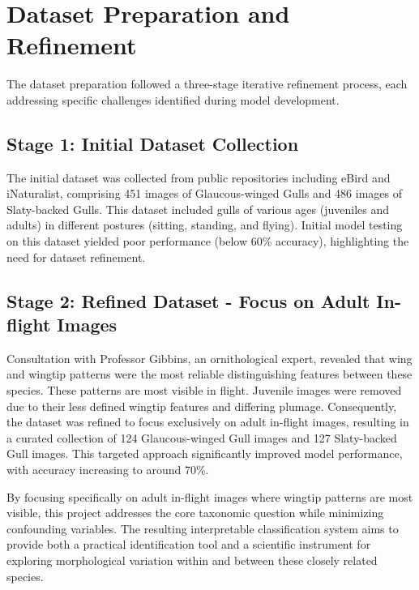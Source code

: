 \documentclass[a4paper,12pt]{report}
\begin{document}
\section{Dataset Preparation and Refinement}

The dataset preparation followed a three-stage iterative refinement process, each addressing specific challenges identified during model development.

\subsection{Stage 1: Initial Dataset Collection}

The initial dataset was collected from public repositories including eBird and iNaturalist, comprising 451 images of Glaucous-winged Gulls and 486 images of Slaty-backed Gulls. This dataset included gulls of various ages (juveniles and adults) in different postures (sitting, standing, and flying). Initial model testing on this dataset yielded poor performance (below 60\% accuracy), highlighting the need for dataset refinement. 


\subsection{Stage 2: Refined Dataset - Focus on Adult In-flight Images}

Consultation with Professor Gibbins, an ornithological expert, revealed that wing and wingtip patterns were the most reliable distinguishing features between these species. These patterns are most visible in flight. Juvenile images were removed due to their less defined wingtip features and differing plumage. Consequently, the dataset was refined to focus exclusively on adult in-flight images, resulting in a curated collection of 124 Glaucous-winged Gull images and 127 Slaty-backed Gull images. This targeted approach significantly improved model performance, with accuracy increasing to around 70\%.

By focusing specifically on adult in-flight images where wingtip patterns are most visible, this project addresses the core taxonomic question while minimizing confounding variables. The resulting interpretable classification system aims to provide both a practical identification tool and a scientific instrument for exploring morphological variation within and between these closely related species.
\end{document}
